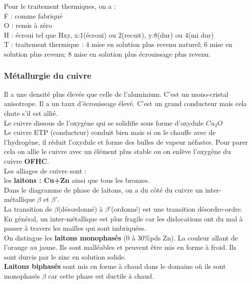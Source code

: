 \documentclass[../main.tex]{subfiles}
\begin{document}
Pour le traitement thermiques, on a :\\
F : comme fabriqué\\
O : remis à zéro\\
H : écroui tel que Hxy, x:1(écroui) ou 2(recuit), y:8(dur) ou 4(mi dur)\\
T : traitement thermique : 4 mise en solution plus revenu naturel; 6 mise en solution plus revenu; 8 mise en solution plus écrouissage plus revenu.\\

\subsubsection{Métallurgie du cuivre}
Il a une densité plus élevée que celle de l'aluminium. C'est un mono-cristal anisotrope. Il a un taux d'écrouissage élevé. C'est un grand conducteur mais cela chute s'il est allié.\\

Le cuivre dissous de l'oxygène qui se solidifie sous forme d'oxydule $Cu_2O$\\
Le cuivre ETP (conducteur) conduit bien mais si on le chauffe avec de l'hydrogène, il réduit l'oxydule et forme des bulles de vapeur néfastes. Pour parer cela on allie le cuivre avec un élément plus stable ou on enlève l'oxygène du cuivre \textbf{OFHC}.\\

Les alliages de cuivre sont :\\
les \textbf{laitons : Cu+Zn} ainsi que tous les bronzes.\\

Dans le diagramme de phase de laitons, on a du côté du cuivre un inter-métallique $\beta$ et $\beta'$.\\
La transition de $\beta$(désordonné) à $\beta'$(ordonné) est une transition désordre-ordre. \\
En général, un inter-métallique est plus fragile car les dislocations ont du mal à passer à travers les mailles qui sont imbriquées.\\

On distingue les \textbf{laitons monophasés} (0 à 30$\%$pds Zn). La couleur allant de l'orange au jaune. Ils sont malléables et peuvent être mis en forme à froid. Ils sont durcis par le zinc en solution solide.\\

\textbf{Laitons biphasés} sont mis en forme à chaud dans le domaine où ils sont monophasés $\beta$ car cette phase est ductile à chaud.\\
\end{document}
